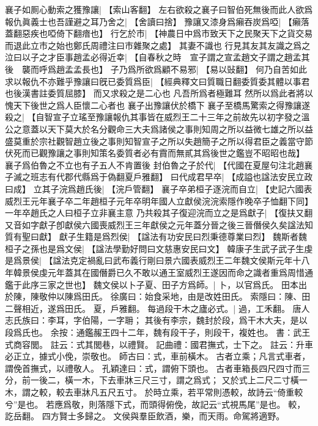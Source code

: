 襄子如厠心動索之獲豫讓|{
	【索山客翻】}
左右欲殺之襄子曰智伯死無後而此人欲爲報仇眞義士也吾謹避之耳乃舍之|{
	【舍讀曰捨】}
豫讓又漆身爲癩吞炭爲啞|{
	【癩落蓋翻惡疾也啞倚下翻瘖也】}
行乞於市|{
	【神農日中爲市致天下之民聚天下之貨交易而退此立市之始也鄭氏周禮注曰市雜聚之處】}
其妻不識也
行見其友其友識之爲之泣曰以子之才臣事趙孟必得近幸|{
	【自春秋之時　宣子謂之宣孟趙文子謂之趙孟其後　襲而呼爲趙孟孟長也】}
子乃爲所欲爲顧不易邪|{
	【易以䜴翻】}
何乃自苦如此
求以報仇不亦難乎豫讓曰旣已委質爲臣|{
	【經典釋文曰質職日翻委質委其體以事君也後漢書註委質屈膝】}
而又求殺之是二心也
凡吾所爲者極難耳
然所以爲此者將以愧天下後世之爲人臣懷二心者也
襄子出豫讓伏於橋下
襄子至橋馬驚索之得豫讓遂殺之|{
	【自智宣子立瑤至豫讓報仇其事皆在威烈王二十三年之前故先以初字發之溫公之意蓋以天下莫大於名分觀命三大夫爲諸侯之事則知周之所以益微七雄之所以益盛莫重於宗社觀智趙立後之事則知智宣子之所以失趙簡子之所以得君臣之義當守節伏死而已觀豫讓之事則知策名委質者必有霣而無貳其爲後世之鑑豈不昭昭也哉】
	}
襄子爲伯魯之不立也有子五人不肯置後
封伯魯之子於代|{
	【代國在夏屋句注北趙襄子滅之班志有代郡代縣爲于偽翻夏戶雅翻】}
曰代成君早卒|{
	【成謚也諡法安民立政曰成】}
立其子浣爲趙氏後|{
	【浣戶管翻】}
襄子卒弟桓子逐浣而自立|{
	【史記六國表威烈王元年襄子卒二年趙桓子元年卒明年國人立獻侯浣浣索隱作晚卒子恤翻下同】}
一年卒趙氏之人曰桓子立非襄主意
乃共殺其子復迎浣而立之是爲獻子|{
	【復扶又翻又音如字獻子卽獻侯六國喪威烈王三年獻侯之元年蓋分晉之後三晉僭侯久矣諡法知質有聖曰獻】}
獻子生籍是爲烈侯|{
	【諡法有功安民曰烈秉德尊業曰烈】}
魏斯者魏桓子之孫也是爲文侯|{
	【諡法學勤好問曰文慈惠安民曰文】}
韓康子生武子武子生虔是爲景侯|{
	【諡法克定禍亂曰武布義行剛曰景六國表威烈王二年魏文侯斯元年十八年韓景侯虔元年蓋其在國僭爵已久不敢以通王室威烈王遂因而命之識者重爲周惜通鑑于此序三家之世也】}
魏文侯以卜子夏、田子方爲師。|{
	卜，以官爲氏。
	田本出於陳，陳敬仲以陳爲田氏。
	徐廣曰：始食采地，由是改姓田氏。
	索隱曰：陳、田二聲相近，遂爲田氏。
	夏，戶雅翻。
	}
每過段干木之廬必式。|{
	過，工禾翻。
	唐人志氏族曰：李耳，字伯陽，一字耼；
	其後有李宗，魏封於段，爲干木大夫，是以段爲氏也。
	余按：通鑑赧王四十二年，魏有段干子，則段干，複姓也。
	書：武王式商容閭。
	註云：式其閭巷，以禮賢。
	記曲禮：國君撫式，士下之。
	註云：升車必正立，據式小俛，崇敬也。
	師古曰：式，車前橫木。
	古者立乘；凡言式車者，謂俛首撫式，以禮敬人。
	孔穎達曰：式，謂俯下頭也。
	古者車箱長四尺四寸而三分，前一後二，橫一木，下去車牀三尺三寸，謂之爲式；
	又於式上二尺二寸橫一木，謂之較，較去車牀凡五尺五寸。
	於時立乘，若平常則憑較，故詩云“倚重較兮”是也。
	若應爲敬，則落隱下式，而頭得俯俛，故記云“式視馬尾”是也。
	較，訖岳翻。
	}
四方賢士多歸之。
文侯與羣臣飲酒，樂，而天雨。命駕將適野。
